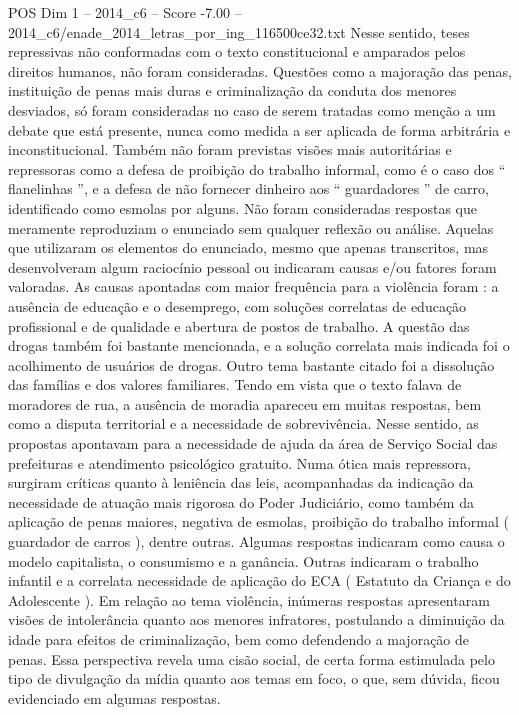 \begin{textsample}{POS Dim 1 – 2014\_c6 – Score -7.00 – 2014\_c6/enade\_2014\_letras\_por\_ing\_116500ce32.txt}
Nesse sentido, teses repressivas não conformadas com o texto constitucional e amparados pelos direitos humanos, não foram consideradas.
Questões como a majoração das penas, instituição de penas mais duras e criminalização da conduta dos menores desviados, só foram consideradas no caso de serem tratadas como menção a um debate que está presente, nunca como medida a ser aplicada de forma arbitrária e inconstitucional.
Também não foram previstas visões mais autoritárias e repressoras como a defesa de proibição do trabalho informal, como é o caso dos “ flanelinhas ”, e a defesa de não fornecer dinheiro aos “ guardadores ” de carro, identificado como esmolas por alguns.
Não foram consideradas respostas que meramente reproduziam o enunciado sem qualquer reflexão ou análise.
Aquelas que utilizaram os elementos do enunciado, mesmo que apenas transcritos, mas desenvolveram algum raciocínio pessoal ou indicaram causas e/ou fatores foram valoradas.
As causas apontadas com maior frequência para a violência foram : a ausência de educação e o desemprego, com soluções correlatas de educação profissional e de qualidade e abertura de postos de trabalho.
A questão das drogas também foi bastante mencionada, e a solução correlata mais indicada foi o acolhimento de usuários de drogas.
Outro tema bastante citado foi a dissolução das famílias e dos valores familiares.
Tendo em vista que o texto falava de moradores de rua, a ausência de moradia apareceu em muitas respostas, bem como a disputa territorial e a necessidade de sobrevivência.
Nesse sentido, as propostas apontavam para a necessidade de ajuda da área de Serviço Social das prefeituras e atendimento psicológico gratuito.
Numa ótica mais repressora, surgiram críticas quanto à leniência das leis, acompanhadas da indicação da necessidade de atuação mais rigorosa do Poder Judiciário, como também da aplicação de penas maiores, negativa de esmolas, proibição do trabalho informal ( guardador de carros ), dentre outras.
Algumas respostas indicaram como causa o modelo capitalista, o consumismo e a ganância.
Outras indicaram o trabalho infantil e a correlata necessidade de aplicação do ECA ( Estatuto da Criança e do Adolescente ).
Em relação ao tema violência, inúmeras respostas apresentaram visões de intolerância quanto aos menores infratores, postulando a diminuição da idade para efeitos de criminalização, bem como defendendo a majoração de penas.
Essa perspectiva revela uma cisão social, de certa forma estimulada pelo tipo de divulgação da mídia quanto aos temas em foco, o que, sem dúvida, ficou evidenciado em algumas respostas.

\end{textsample}
